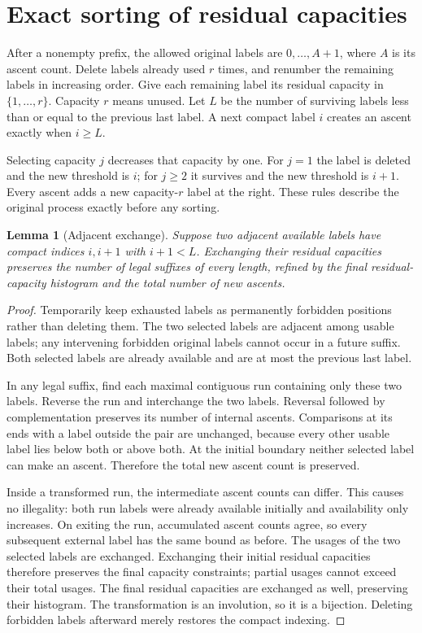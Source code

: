 \documentclass[11pt,letterpaper]{article}
\newtheorem{lemma}[theorem]{Lemma}
\theoremstyle{remark}\newtheorem{remark}[theorem]{Remark}
\begin{document}
\section{Exact sorting of residual capacities}\label{amc:bm:sec:compaction}
After a nonempty prefix, the allowed original labels are $0,\ldots,A+1$, where $A$ is its ascent count. Delete labels already used $r$ times, and renumber the remaining labels in increasing order. Give each remaining label its residual capacity in $\{1,\ldots,r\}$. Capacity $r$ means unused. Let $L$ be the number of surviving labels less than or equal to the previous last label. A next compact label $i$ creates an ascent exactly when $i\ge L$.

Selecting capacity $j$ decreases that capacity by one. For $j=1$ the label is deleted and the new threshold is $i$; for $j\ge2$ it survives and the new threshold is $i+1$. Every ascent adds a new capacity-$r$ label at the right. These rules describe the original process exactly before any sorting.

\begin{lemma}[Adjacent exchange]\label{amc:bm:lem:exchange}
Suppose two adjacent available labels have compact indices $i,i+1$ with $i+1<L$. Exchanging their residual capacities preserves the number of legal suffixes of every length, refined by the final residual-capacity histogram and the total number of new ascents.
\end{lemma}
\begin{proof}
Temporarily keep exhausted labels as permanently forbidden positions rather than deleting them. The two selected labels are adjacent among usable labels; any intervening forbidden original labels cannot occur in a future suffix. Both selected labels are already available and are at most the previous last label.

In any legal suffix, find each maximal contiguous run containing only these two labels. Reverse the run and interchange the two labels. Reversal followed by complementation preserves its number of internal ascents. Comparisons at its ends with a label outside the pair are unchanged, because every other usable label lies below both or above both. At the initial boundary neither selected label can make an ascent. Therefore the total new ascent count is preserved.

Inside a transformed run, the intermediate ascent counts can differ. This causes no illegality: both run labels were already available initially and availability only increases. On exiting the run, accumulated ascent counts agree, so every subsequent external label has the same bound as before. The usages of the two selected labels are exchanged. Exchanging their initial residual capacities therefore preserves the final capacity constraints; partial usages cannot exceed their total usages. The final residual capacities are exchanged as well, preserving their histogram. The transformation is an involution, so it is a bijection. Deleting forbidden labels afterward merely restores the compact indexing.
\end{proof}
\end{document}
